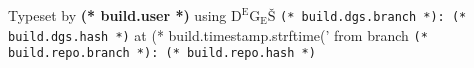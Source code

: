     \vfill
    {
        \tiny
        \color{darkgray}
        \hfill
        Typeset by \textbf{(* build.user *)} using $\mathrm{D^{\!E}\!G\!_{\displaystyle E}\!\text{Š}}$
        \texttt{(* build.dgs.branch *): (* build.dgs.hash *)}
        at (* build.timestamp.strftime('%
        from branch \texttt{(* build.repo.branch *): (* build.repo.hash *)}%
    }

